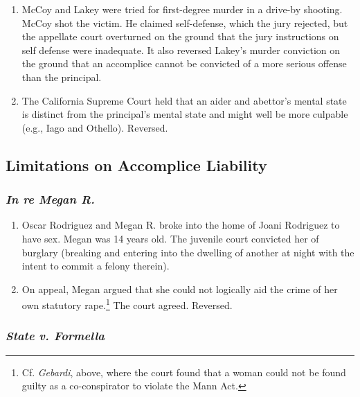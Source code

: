 \begin{enumerate}
    \item McCoy and Lakey were tried for first-degree murder in a drive-by 
    shooting. McCoy shot the victim. He claimed self-defense, which the jury 
    rejected, but the appellate court overturned on the ground that the jury 
    instructions on self defense were inadequate. It also reversed Lakey's 
    murder conviction on the ground that an accomplice cannot be convicted of 
    a more serious offense than the principal.
    \item The California Supreme Court held that an aider and abettor's mental 
    state is distinct from the principal's mental state and might well be 
    more culpable (e.g., Iago and Othello). Reversed.
\end{enumerate}

\subsection{Limitations on Accomplice Liability}

\subsubsection{\emph{In re Megan R.}}

\begin{enumerate}
    \item Oscar Rodriguez and Megan R. broke into the home of Joani Rodriguez 
    to have sex. Megan was 14 years old. The juvenile court convicted her of 
    burglary (breaking and entering into the dwelling of another at night with 
    the intent to commit a felony therein).
    \item On appeal, Megan argued that she could not logically aid the crime 
    of her own statutory rape.\footnote{Cf. \emph{Gebardi}, above, where the 
    court found that a woman could not be found guilty as a co-conspirator to 
    violate the Mann Act.} The court agreed. Reversed.
\end{enumerate}

\subsubsection{\emph{State v. Formella}}

